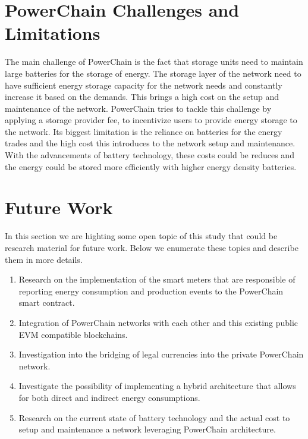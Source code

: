 \section{PowerChain Challenges and Limitations}
The main challenge of PowerChain is the fact that storage units need to maintain large batteries for the storage of energy. The storage layer of the network need to have sufficient energy 
storage capacity for the network needs and constantly increase it based on the demands. This brings a high cost on the setup and maintenance of the network. PowerChain tries to tackle this 
challenge by applying a storage provider fee, to incentivize users to provide energy storage to the network. Its biggest limitation is the reliance on batteries for the energy trades 
and the high cost this introduces to the network setup and maintenance. With the advancements of battery technology, these costs could be reduces and the energy could be stored more efficiently with higher
energy density batteries.\\ 

\section{Future Work}
In this section we are highting some open topic of this study that could be research material for future work. Below we enumerate these topics and describe them in more details.
\begin{enumerate}
    \item Research on the implementation of the smart meters that are responsible of reporting energy consumption and production events to the PowerChain smart contract.
    \item Integration of PowerChain networks with each other and this existing public EVM compatible blockchains.
    \item Investigation into the bridging of legal currencies into the private PowerChain network.
    \item Investigate the possibility of implementing a hybrid architecture that allows for both direct and indirect energy consumptions.
    \item Research on the current state of battery technology and the actual cost to setup and maintenance a network leveraging PowerChain architecture.
\end{enumerate}
